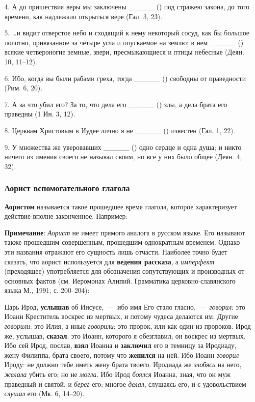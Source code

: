\documentclass[11pt,a4paper,oneside]{memoir}
\begin{document}
    4. А до пришествия веры мы заключены _____ ({}) под стражею закона, до того времени, как надлежало открыться вере (Гал. 3, 23).
    
    5. \ldots и видит отверстое небо и сходящий к нему некоторый сосуд, как бы большое полотно, привязанное за четыре угла и опускаемое на землю; в нем _____ ({}) всякие четвероногие земные, звери, пресмыкающиеся и птицы небесные (Деян. 10, 11--12).
    
    6. Ибо, когда вы были рабами греха, тогда _____ ({}) свободны от праведности (Рим. 6, 20).
    
    7. А за что убил его? За то, что дела его _____ ({}) злы, а дела брата его праведны (1 Ин. 3, 12).
    
    8. Церквам Христовым в Иудее лично я не _____ ({}) известен (Гал. 1, 22).
    
    9. У множества же уверовавших _____ ({}) одно сердце и одна душа; и никто ничего из имения своего не называл своим, но все у них было общее (Деян. 4, 32).

                \subsubsection{Аорист вспомогательного глагола {}}

    \textbf{Аористом} называется такое прошедшее время глагола, которое характеризует действие вполне законченное. Например:
    
    
    \bigskip{}

    \textbf{Примечание}: \emph{Аорист} не имеет прямого аналога в русском языке. Его называют также прошедшим совершенным, прошедшим однократным временем. Однако эти названия отражают его сущность лишь отчасти. Наиболее точно будет сказать, что аорист используется для \textbf{ведения рассказа}, а \emph{имперфект} (преходящее) употребляется для обозначения сопутствующих и производных от основных фактов (см. Иеромонах Алипий. Грамматика церковно-славянского языка М., 1991, с. 200--204):
    
    Царь Ирод, \textbf{услышав} об Иисусе,~---~ибо имя Его стало гласно,~---~\emph{говорил}: это Иоанн Креститель воскрес из мертвых, и потому чудеса делаются им. Другие \emph{говорили}: это Илия, а иные \emph{говорили}: это пророк, или как один из пророков. Ирод же, услышав, \textbf{сказал}: это Иоанн, которого я обезглавил; он воскрес из мертвых. Ибо сей Ирод, послав, \textbf{взял} Иоанна и \textbf{заключил} его в темницу за Иродиаду, жену Филиппа, брата своего, потому что \textbf{женился} на ней. Ибо Иоанн \emph{говорил} Ироду: не должно тебе иметь жену брата твоего. Иродиада же \emph{злобясь} на него, \emph{желала} убить его; но не \emph{могла}. Ибо Ирод \emph{боялся} Иоанна, зная, что он муж праведный и святой, и \emph{берег} его; многое \emph{делал}, слушаясь его, и с удовольствием \emph{слушал} его (Мк. 6, 14--20).
    
\end{document}
